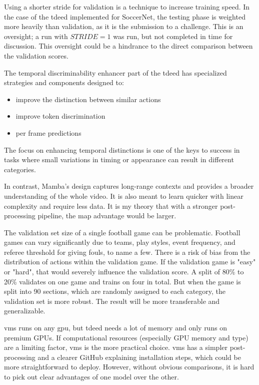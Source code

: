 Using a shorter stride for validation is a technique to increase training speed. In the case of the \acrshort{tdeed} implemented for SoccerNet, the testing phase is weighted more heavily than validation, as it is the submission to a challenge. This is an oversight; a run with \(STRIDE=1\) was run, but not completed in time for discussion. This oversight could be a hindrance to the direct comparison between the validation scores. 


The temporal discriminability enhancer part of the \acrfull{tdeed} has specialized strategies and components designed to:
\begin{itemize}
    \item improve the distinction between similar actions
    \item improve token discrimination
    \item per frame predictions
\end{itemize}

The focus on enhancing temporal distinctions is one of the keys to success in tasks where small variations in timing or appearance can result in different categories. 

In contrast, Mamba's design captures long-range contexts and provides a broader understanding of the whole video. It is also meant to learn quicker with linear complexity and require less data. It is my theory that with a stronger post-processing pipeline, the \acrshort{map} advantage would be larger. 

The validation set size of a single football game can be problematic. Football games can vary significantly due to teams, play styles, event frequency, and referee threshold for giving fouls, to name a few. There is a risk of bias from the distribution of actions within the validation game. If the validation game is "easy" or "hard", that would severely influence the validation score. A split of 80\% to 20\% validates on one game and trains on four in total. But when the game is split into 90 sections, which are randomly assigned to each category, the validation set is more robust. The result will be more transferable and generalizable. 

\acrshort{vms} runs on any \acrshort{gpu}, but \acrshort{tdeed} needs a lot of memory and only runs on premium GPUs. If computational resources (especially GPU memory and type) are a limiting factor, \acrshort{vms} is the more practical choice. \acrshort{vms} has a simpler post-processing and a clearer GitHub explaining installation steps, which could be more straightforward to deploy. However, without obvious comparisons, it is hard to pick out clear advantages of one model over the other. 


